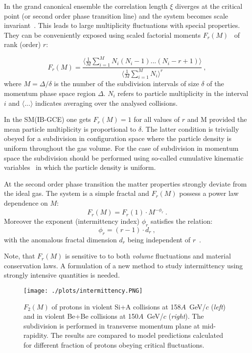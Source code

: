 \documentclass{PoS}
\begin{document}
In the grand canonical ensemble the correlation length $\xi$  diverges
at the critical point (or second order phase transition line) and
the system becomes scale invariant~\cite{Wosiek:1988,Satz:1989vj}. 
This leads to large multiplicity fluctuations with special properties.
They can be conveniently exposed using scaled 
factorial moments $F_r(M)$~\cite{Bialas:1985jb} of rank (order) $r$: 

\begin{equation}
F_r(M)=\frac{ \langle \displaystyle{\frac{1}{M}\sum_{i=1}^{M}} 
	N_i(N_i-1)...(N_i-r+1) \rangle }
{\langle \displaystyle{\frac{1}{M}\sum_{i=1}^{M}} N_i \rangle^r } ~,
\label{eq:facmom}
\end{equation}
where
$M = \Delta / \delta$ is the number of the subdivision intervals of size
$\delta$ of the momentum phase space region $\Delta$.
$N_i$ refers to particle multiplicity in the interval $i$ and
$\langle ... \rangle$ indicates averaging over the analysed collisions.

In the SM(IB-GCE) one gets $F_r(M) = 1$
for all values of $r$ and M provided 
the mean particle multiplicity is proportional to $\delta$.
The latter condition is trivially obeyed for a subdivision in configuration
space where the particle density is uniform throughout the
gas volume. For the case of subdivision in momentum
space the subdivision should be performed using so-called 
cumulative kinematic variables~\cite{Bialas:1990dk} in which 
the particle density is uniform.


At the second order phase transition the matter properties 
strongly deviate from the ideal gas.  The system is a simple
fractal and $F_r(M)$ possess
a power law dependence on $M$:
\begin{equation}
F_r(M) = F_r(1) \cdot M^{-\phi_r} ~.
\label{eq:p1}
\end{equation}
Moreover the exponent (intermittency index) $\phi_r$ satisfies the relation:
\begin{equation}
\phi_r = ( r - 1 ) \cdot d_r ~,
\label{eq:p2}
\end{equation}
with the anomalous fractal dimension $d_r$ being independent 
of $r$~\cite{Bialas:1990xd}.

Note, that $F_r(M)$ is sensitive to to both \textit{volume} fluctuations and material conservation laws.
A formulation of a new method to study intermittency using strongly intensive quantities is needed.


\begin{figure}[h]
	\centering
	\texttt{[image: ./plots/intermittency.PNG]}
	\caption[]
	{
    $F_2(M)$ of protons in violent Si+A collisions at 158$A$~GeV/$c$ (\textit{left}) and in violent Be+Be collisions 
    at 150$A$~GeV/$c$ (\textit{right}). The subdivision is performed in transverse momentum plane at mid-rapidity. 
    The results are compared to model predictions calculated for different fraction of protons obeying critical fluctuations. 
	}
	\label{fig:intermittency}
\end{figure}
\end{document}
